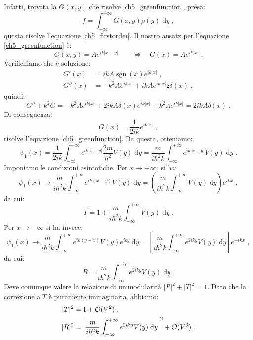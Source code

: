 \documentclass[10pt,a4paper]{report}
\theoremstyle{definition}
\numberwithin{equation}{section}
\newcommand{\diff}[1][]{\mathrm{d}#1}
\begin{document}
Infatti, trovata la $G(x,y)$ che risolve \eqref{ch5_greenfunction}, presa:
$$
f=\int_{-\infty}^{+\infty} G(x,y)\rho(y)\;\diff{y}\;,
$$
questa risolve l'equazione \eqref{ch5_firstorder}. Il nostro ansatz per l'equazione \eqref{ch5_greenfunction} è:
\begin{equation}
G(x,y)=Ae^{ik|x-y|} \qquad \Longleftrightarrow\quad  G(x)=Ae^{ik|x|}\;.
\end{equation}
Verifichiamo che è soluzione:
\begin{align*}
G'(x) &= ikA\operatorname{sgn}(x)e^{ik|x|}\;, \\
G''(x) &= -k^2Ae^{ik|x|}+ikAe^{ik|x|}2\delta(x)\;,
\end{align*}
quindi:
\begin{equation}
G''+k^2G=-k^2Ae^{ik|x|}+2ikA\delta(x)e^{ik|x|}+k^2Ae^{ik|x|}=2ikA\delta(x)\;.
\end{equation}
Di conseguenza:
\begin{equation}
G(x)=\frac{1}{2ik}e^{ik|x|}\;,
\end{equation}
risolve l'equazione \eqref{ch5_greenfunction}. Da questa, otteniamo:
\begin{equation}
\psi_1(x)=\frac{1}{2ik}\int_{-\infty}^{+\infty} e^{ik|x-y|}\frac{2m}{\hbar^2}V(y)\;\diff{y}=\frac{m}{i\hbar^2k}\int_{-\infty}^{+\infty} e^{ik|x-y|}V(y)\;\diff{y}\;.
\end{equation}
Imponiamo le condizioni asintotiche. Per $x\to+\infty$, si ha:
\begin{equation}
\psi_1(x)\to \frac{m}{i\hbar^2k}\int_{-\infty}^{+\infty}e^{ik(x-y)}V(y)\;\diff{y}=\left(\frac{m}{i\hbar^2k}\int_{-\infty}^{+\infty}V(y)\;\diff{y}\right)e^{ikx}\;,
\end{equation}
da cui:
\begin{equation}
T=1+\frac{m}{i\hbar^2k}\int_{-\infty}^{+\infty}V(y)\;\diff{y}\;.
\end{equation}
Per $x\to-\infty$ si ha invece:
\begin{equation}
\psi_1(x)\to \frac{m}{i\hbar^2 k}\int_{-\infty}^{+\infty} e^{ik(y-x)}V(y)e^{iky}\;\diff{y}=\left[\frac{m}{i\hbar^2 k}\int_{-\infty}^{+\infty} e^{2iky}V(y)\;\diff{y}\right]e^{-ikx}\;,
\end{equation}
da cui:
\begin{equation}
R=\frac{m}{i\hbar^2 k}\int_{-\infty}^{+\infty} e^{2iky}V(y)\;\diff{y}\;.
\end{equation}
Deve comunque valere la relazione di unimodularità $|R|^2+|T|^2=1$. Dato che la correzione a $T$ è puramente immaginaria, abbiamo:
\begin{align}
|T|^2&=1+\mathcal{O}(V^2) \label{ch5_t2}\;, \\
|R|^2&=\left|\frac{m}{i\hbar^2 k}\int_{-\infty}^{+\infty} e^{2iky}V(y)\;\diff{y}\right|^2+\mathcal{O}(V^3)\notag \;.
\end{align}
\end{document}

